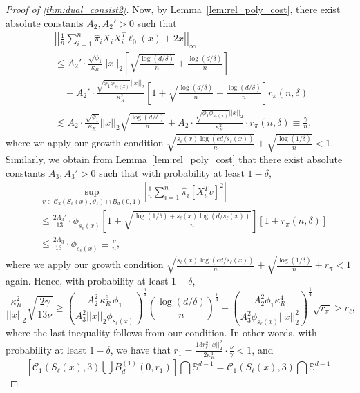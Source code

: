 \documentclass[ejsv2,noshowframe]{imsart}
\theoremstyle{plain}
\theoremstyle{definition}
\theoremstyle{remark}
\newcommand{\norm}[1]{\left|\left| #1 \right|\right|}
\renewcommand{\hat}{\widehat}
\begin{document}
\begin{proof}[Proof of \autoref{thm:dual_consist2}]
	Now, by Lemma~\ref{lem:rel_poly_cost}, there exist absolute constants $A_2,A_2'>0$ such that 
	\begin{align*}
		&\norm{\frac{1}{n}\sum_{i=1}^n \hat{\pi}_i X_i X_i^T \ell_0(x) + 2x}_{\infty} \\
		&\leq A_2'\cdot \frac{\sqrt{\phi_1}}{\kappa_R}\norm{x}_2 \left[\sqrt{\frac{\log(d/\delta)}{n}} + \frac{\log(d/\delta)}{n} \right]\\
		&\quad + A_2'\cdot \frac{\sqrt{\phi_1 \phi_{s_{\ell}(x)}}\norm{x}_2}{\kappa_R^2} \left[1 + \sqrt{\frac{\log(d/\delta)}{n}} + \frac{\log(d/\delta)}{n}\right] r_{\pi}(n,\delta)\\
		&\lesssim A_2\cdot \frac{\sqrt{\phi_1}}{\kappa_R}\norm{x}_2\sqrt{\frac{\log(d/\delta)}{n}} + A_2\cdot \frac{\sqrt{\phi_1 \phi_{s_{\ell}(x)}}\norm{x}_2}{\kappa_R^2} \cdot r_{\pi}(n,\delta) \equiv \frac{\gamma}{n},
	\end{align*}
	where we apply our growth condition $\sqrt{\frac{s_{\ell}(x)\log(ed/s_{\ell}(x))}{n}} + \sqrt{\frac{\log(1/\delta)}{n}} < 1$. Similarly, we obtain from Lemma~\ref{lem:rel_poly_cost} that there exist absolute constants $A_3,A_3'>0$ such that with probability at least $1-\delta$,
	\begin{align*}
		&\sup_{v\in \mathcal{C}_2\left(S_{\ell}(x), \vartheta_{\ell}\right)\cap B_d(0,1)} \left|\frac{1}{n} \sum_{i=1}^n \hat{\pi}_i\left[X_i^Tv\right]^2 \right| \\
		&\leq \frac{2A_3'}{13}\cdot \phi_{s_{\ell}(x)}\left[1+ \sqrt{\frac{\log(1/\delta) + s_{\ell}(x) \log\left(d/s_{\ell}(x)\right)}{n}}\right] \left[1 + r_{\pi}(n,\delta)\right] \\
		&\leq \frac{2A_3}{13}\cdot \phi_{s_{\ell}(x)} \equiv \frac{\nu}{n},
	\end{align*}
	where we apply our growth condition $\sqrt{\frac{s_{\ell}(x)\log(ed/s_{\ell}(x))}{n}} + \sqrt{\frac{\log(1/\delta)}{n}} + r_{\pi} < 1$ again. Hence, with probability at least $1-\delta$,
	$$\frac{\kappa_R^2}{\norm{x}_2} \sqrt{\frac{2\gamma}{13\nu}} \geq \left(\frac{A_2^2 \,\kappa_R^6\, \phi_1}{A_3^2\norm{x}_2 \phi_{s_{\ell}(x)}}\right)^{\frac{1}{4}} \left(\frac{\log(d/\delta)}{n}\right)^{\frac{1}{4}} + \left(\frac{A_2^2 \phi_1 \kappa_R^4}{A_3^2 \phi_{s_{\ell}(x)} \norm{x}_2^2}\right)^{\frac{1}{4}} \sqrt{r_{\pi}} > r_{\ell},$$
	where the last inequality follows from our condition. In other words, with probability at least $1-\delta$, we have that $r_1= \frac{13 r_{\ell}^2 \norm{x}_2^2}{2 \kappa_R^4} \cdot \frac{\nu}{\gamma} < 1$, and 
	$$\left[\mathcal{C}_1\left(S_{\ell}(x), 3 \right) \bigcup B_d^{(1)}(0,r_1)\right] \bigcap \mathbb{S}^{d-1} = \mathcal{C}_1\left(S_{\ell}(x), 3 \right) \bigcap \mathbb{S}^{d-1}.$$
	

\end{proof}
\end{document}
